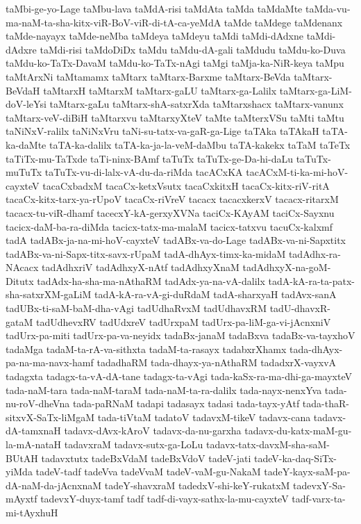 {taMbi-ge-yo-Lage
taMbu-lava
taMdA-risi
taMdAta
taMda
taMdaMte
taMda-vu-ma-naM-ta-sha-kitx-viR-BoV-viR-di-tA-ca-yeMdA
taMde
taMdege
taMdenanx
taMde-nayayx
taMde-neMba
taMdeya
taMdeyu
taMdi
taMdi-dAdxne
taMdi-dAdxre
taMdi-risi
taMdoDiDx
taMdu
taMdu-dA-gali
taMdudu
taMdu-ko-Duva
taMdu-ko-TaTx-DavaM
taMdu-ko-TaTx-nAgi
taMgi
taMja-ka-NiR-keya
taMpu
taMtArxNi
taMtamamx
taMtarx
taMtarx-Barxme
taMtarx-BeVda
taMtarx-BeVdaH
taMtarxH
taMtarxM
taMtarx-gaLU
taMtarx-ga-Lalilx
taMtarx-ga-LiM-doV-leYsi
taMtarx-gaLu
taMtarx-shA-satxrXda
taMtarxshacx
taMtarx-vanunx
taMtarx-veV-diBiH
taMtarxvu
taMtarxyXteV
taMte
taMterxVSu
taMti
taMtu
taNiNxV-ralilx
taNiNxVru
taNi-su-tatx-va-gaR-ga-Lige
taTAka
taTAkaH
taTA-ka-daMte
taTA-ka-dalilx
taTA-ka-ja-la-veM-daMbu
taTA-kakekx
taTaM
taTeTx
taTiTx-mu-TaTxde
taTi-ninx-BAmf
taTuTx
taTuTx-ge-Da-hi-daLu
taTuTx-muTuTx
taTuTx-vu-di-lalx-vA-du-da-riMda
tacACxKA
tacACxM-ti-ka-mi-hoV-cayxteV
tacaCxbadxM
tacaCx-ketxVsutx
tacaCxkitxH
tacaCx-kitx-riV-ritA
tacaCx-kitx-tarx-ya-rUpoV
tacaCx-riVreV
tacacx
tacacxkerxV
tacacx-ritarxM
tacacx-tu-viR-dhamf
tacecxY-kA-gerxyXVNa
taciCx-KAyAM
taciCx-Sayxnu
tacicx-daM-ba-ra-diMda
tacicx-tatx-ma-malaM
tacicx-tatxvu
tacuCx-kalxmf
tadA
tadABx-ja-na-mi-hoV-cayxteV
tadABx-va-do-Lage
tadABx-va-ni-Sapxtitx
tadABx-va-ni-Sapx-titx-savx-rUpaM
tadA-dhAyx-timx-ka-midaM
tadAdhx-ra-NAcacx
tadAdhxriV
tadAdhxyX-nAtf
tadAdhxyXnaM
tadAdhxyX-na-goM-Ditutx
tadAdx-ha-sha-ma-nAthaRM
tadAdx-ya-na-vA-dalilx
tadA-kA-ra-ta-patx-sha-satxrXM-gaLiM
tadA-kA-ra-vA-gi-duRdaM
tadA-sharxyaH
tadAvx-sanA
tadUBx-ti-saM-baM-dha-vAgi
tadUdhaRvxM
tadUdhavxRM
tadU-dhavxR-gataM
tadUdhevxRV
tadUdxreV
tadUrxpaM
tadUrx-pa-liM-ga-vi-jAcnxniV
tadUrx-pa-miti
tadUrx-pa-va-neyidx
tadaBx-janaM
tadaBxva
tadaBx-va-tayxhoV
tadaMga
tadaM-ta-rA-va-sithxta
tadaM-ta-rasayx
tadabxrXhamx
tada-dhAyx-pa-na-ma-navx-hamf
tadadhaRM
tada-dhayx-ya-nAthaRM
tadadxrX-vayxvA
tadagxta
tadagx-ta-vA-dA-tane
tadagx-ta-vAgi
tada-kaSx-ra-ma-dhi-ga-mayxteV
tada-naM-tara
tada-naM-taraM
tada-naM-ta-ra-dalilx
tada-nayx-nenxYva
tada-nu-roV-dheVna
tada-paRNaM
tadapi
tadasayx
tadasi
tada-tayx-yAtf
tada-thaR-sitxvX-SaTx-liMgaM
tada-tiVtaM
tadatoV
tadavxM-tikeV
tadavx-cana
tadavx-dA-tamxnaH
tadavx-dAvx-kAroV
tadavx-da-nu-garxha
tadavx-du-katx-maM-gu-la-mA-nataH
tadavxraM
tadavx-sutx-ga-LoLu
tadavx-tatx-davxM-sha-saM-BUtAH
tadavxtutx
tadeBxVdaM
tadeBxVdoV
tadeV-jati
tadeV-ka-daq-SiTx-yiMda
tadeV-tadf
tadeVva
tadeVvaM
tadeV-vaM-gu-NakaM
tadeY-kayx-saM-pa-dA-naM-da-jAcnxnaM
tadeY-shavxraM
tadedxV-shi-keY-rukatxM
tadevxY-Sa-mAyxtf
tadevxY-duyx-tamf
tadf
tadf-di-vayx-sathx-la-mu-cayxteV
tadf-varx-ta-mi-tAyxhuH
}
